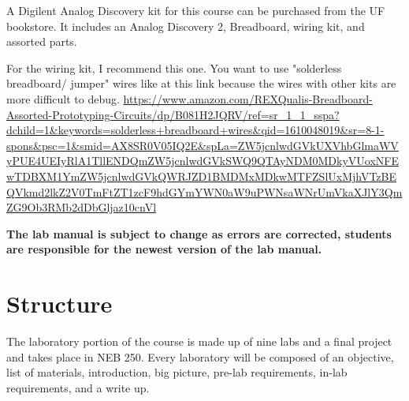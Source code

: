 A Digilent Analog Discovery kit for this course can be purchased from the UF bookstore. It includes an Analog Discovery 2, Breadboard, wiring kit, and assorted parts.

For the wiring kit, I recommend this one. You want to use "solderless breadboard/ jumper" wires like at this link because the wires with other kits are more difficult to debug.
\url{https://www.amazon.com/REXQualis-Breadboard-Assorted-Prototyping-Circuits/dp/B081H2JQRV/ref=sr_1_1_sspa?dchild=1&keywords=solderless+breadboard+wires&qid=1610048019&sr=8-1-spons&psc=1&smid=AX8SR0V05IQ2E&spLa=ZW5jcnlwdGVkUXVhbGlmaWVyPUE4UEIyRlA1TllENDQmZW5jcnlwdGVkSWQ9QTAyNDM0MDkyVUoxNFEwTDBXM1YmZW5jcnlwdGVkQWRJZD1BMDMxMDkwMTFZSlUxMjhVTzBEQVkmd2lkZ2V0TmFtZT1zcF9hdGYmYWN0aW9uPWNsaWNrUmVkaXJlY3QmZG9Ob3RMb2dDbGljaz10cnVl}

\textbf{The lab manual is subject to change as errors are corrected, students are responsible for the newest version of the lab manual. }

\section{Structure}

The laboratory portion of the course is made up of nine labs and a final project and takes place in NEB 250. Every laboratory will be composed of an objective, list of materials, introduction, big picture, pre-lab requirements, in-lab requirements, and a write up. 


